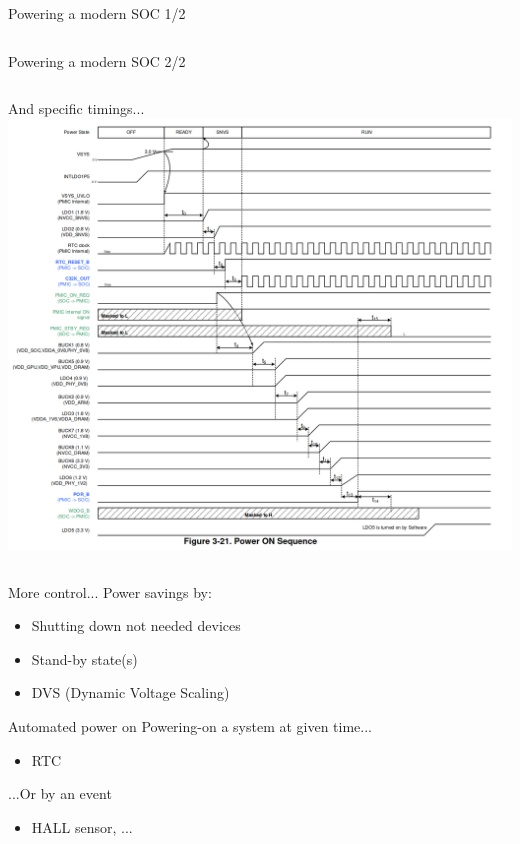 \documentclass[10pt]{beamer}
\begin{document}
\begin{frame}{Powering a modern SOC 1/2}
\begin{columns}
	\end{columns}
\end{frame}

\begin{frame}{Powering a modern SOC 2/2}
	\begin{columns}
		And specific timings...
		\includegraphics[width=1\linewidth]{BD71847_start_up_seq.png}
	\end{columns}
\end{frame}

\begin{frame}{More control...}
Power savings by:
\begin{itemize}
	\item Shutting down not needed devices
	\item Stand-by state(s)
	\item DVS (Dynamic Voltage Scaling)
\end{itemize}
\end{frame}


\begin{frame}{Automated power on}
Powering-on a system at given time...
\begin{itemize}
	\item RTC
\end{itemize}
...Or by an event
\begin{itemize}
	\item HALL sensor, ...
\end{itemize}
\end{frame}
\end{document}
